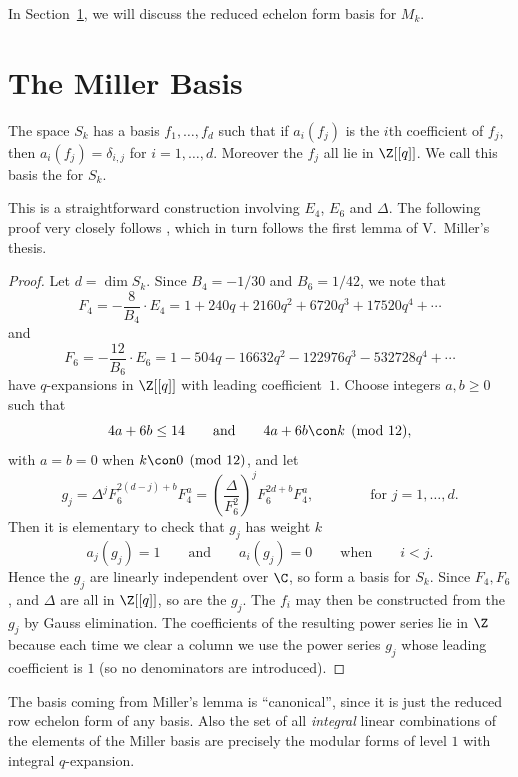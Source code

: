 In Section~\ref{sec:vmthesis}, we will discuss the
reduced echelon form basis for $M_k$.


\section{The Miller Basis}\label{sec:vmthesis}
\begin{lemma}[V. Miller]\label{lem:vm}
The space $S_k$ has a basis $f_1,\ldots, f_{d}$ such
that if $a_i(f_j)$ is the $i$th coefficient of $f_j$, then
$a_i(f_j) = \delta_{i,j}$ for $i=1,\ldots, {d}$.  Moreover
the $f_j$ all lie in $\Z[[q]]$.  We call this basis the
 for $S_k$.
\end{lemma}
This is a straightforward construction involving $E_4$, $E_6$ and
$\Delta$.  The following proof very closely follows \cite[Ch.~X,
Thm.~4.4]{lang:modular}, which in turn follows the
first lemma of V.~Miller's thesis.
\begin{proof}
Let $d=\dim S_k$.
Since $B_4 = -1/30$ and $B_6=1/42$, we note that
$$
 F_4 = -\frac{8}{B_4} \cdot E_4 = 1 + 240q + 2160q^2 + 6720q^3 + 17520q^4 + \cdots
$$ and 
$$
  F_6 = -\frac{12}{B_6}\cdot E_6 = 1 - 504q - 16632q^2 - 122976q^3 - 532728q^4
+\cdots 
$$
have $q$-expansions in $\Z[[q]]$ with leading
coefficient~$1$.
Choose integers $a,b\geq 0$ such that 
$$
  4a+6b\leq 14 \qquad\text{and}\qquad 4a + 6b \con k \pmod{12},
$$
with $a=b=0$ when $k\con 0\pmod{12}$, and
let 
$$
  g_j = \Delta^j F_6^{2(d-j)+b} F_4^a
      = \left(\frac{\Delta}{F_6^2}\right)^j F_6^{2d + b} F_4^a
,\qquad\qquad \text{for } j=1,\ldots,d.
$$
Then it is elementary to check that $g_j$ has weight $k$
$$
 a_j(g_j) = 1 \qquad\text{and}\qquad a_i(g_j)=0\qquad\text{when}\qquad i<j.
$$
Hence the $g_j$ are linearly independent over $\C$, so form
a basis for $S_k$.  Since $F_4, F_6$, and $\Delta$ are all in $\Z[[q]]$,
so are the $g_j$.  The $f_i$ may then be constructed from the $g_j$
by Gauss elimination.  The coefficients of the resulting power series lie in 
$\Z$ because each time we clear a column we use the power series
$g_j$ whose leading coefficient is $1$ (so no denominators are introduced).
\end{proof}
\begin{remark}
The basis coming from Miller's lemma is ``canonical'', 
since it is just the reduced row echelon form of any basis.
Also the set of all {\em integral} linear combinations of
the elements of the Miller basis are precisely
the modular forms of level $1$ with integral $q$-expansion.
\end{remark}


